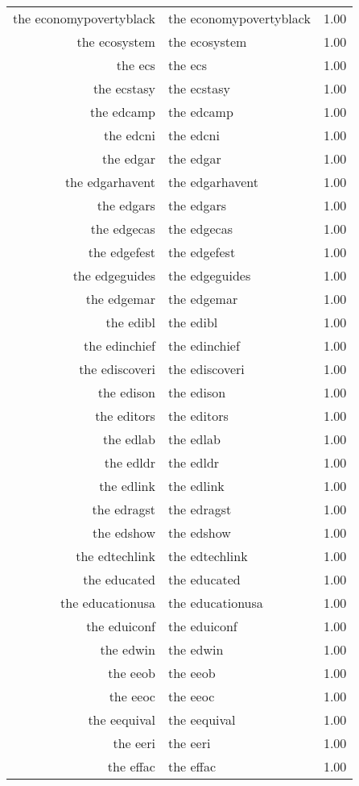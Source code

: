 \begin{table}[ht]
\begin{tabular}{rlr}
  the economypovertyblack & the economypovertyblack & 1.00 \\ 
  the ecosystem & the ecosystem & 1.00 \\ 
  the ecs & the ecs & 1.00 \\ 
  the ecstasy & the ecstasy & 1.00 \\ 
  the edcamp & the edcamp & 1.00 \\ 
  the edcni & the edcni & 1.00 \\ 
  the edgar & the edgar & 1.00 \\ 
  the edgarhavent & the edgarhavent & 1.00 \\ 
  the edgars & the edgars & 1.00 \\ 
  the edgecas & the edgecas & 1.00 \\ 
  the edgefest & the edgefest & 1.00 \\ 
  the edgeguides & the edgeguides & 1.00 \\ 
  the edgemar & the edgemar & 1.00 \\ 
  the edibl & the edibl & 1.00 \\ 
  the edinchief & the edinchief & 1.00 \\ 
  the ediscoveri & the ediscoveri & 1.00 \\ 
  the edison & the edison & 1.00 \\ 
  the editors & the editors & 1.00 \\ 
  the edlab & the edlab & 1.00 \\ 
  the edldr & the edldr & 1.00 \\ 
  the edlink & the edlink & 1.00 \\ 
  the edragst & the edragst & 1.00 \\ 
  the edshow & the edshow & 1.00 \\ 
  the edtechlink & the edtechlink & 1.00 \\ 
  the educated & the educated & 1.00 \\ 
  the educationusa & the educationusa & 1.00 \\ 
  the eduiconf & the eduiconf & 1.00 \\ 
  the edwin & the edwin & 1.00 \\ 
  the eeob & the eeob & 1.00 \\ 
  the eeoc & the eeoc & 1.00 \\ 
  the eequival & the eequival & 1.00 \\ 
  the eeri & the eeri & 1.00 \\ 
  the effac & the effac & 1.00 \\ 

\end{tabular}
\end{table}
